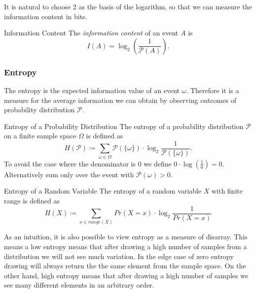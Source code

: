 \documentclass[english]{panikzettel}
\begin{document}
It is natural to choose 2 as the basis of the logarithm, so that we can measure the information content in bits.

\begin{defi}{Information Content}
The \emph{information content} of an event $A$ is
\[
I(A)=\log_2 \left(\frac{1}{\mathcal{P}(A)}\right).
\]
\end{defi}



\subsubsection{Entropy}
The entropy is the expected information value of an event $\omega$. Therefore it is a measure for the average information we can obtain by observing outcomes of probability distribution $\mathcal{P}$.

\begin{halfboxl}
\vspace{-\baselineskip}
\begin{defi}{Entropy of a Probability Distribution}
The entropy of a probability distribution $\mathcal{P}$ on a finite sample space $\Omega$ is defined as
\[
H(\mathcal{P})\coloneqq \sum_{\omega\in\Omega}\mathcal{P}(\{\omega \})\cdot \log_2\frac{1}{\mathcal{P}(\{\omega \})}.
\]
To avoid the case where the denominator is 0 we define $0\cdot \log (\frac{1}{0})=0$. Alternatively sum only over the event with $\mathcal{P}(\omega)>0$.
\end{defi}
\end{halfboxl}
\begin{halfboxr}
\vspace{-\baselineskip}
\begin{defi}{Entropy of a Random Variable}
The entropy of a random variable $X$ with finite range is defined as
{\small{}
\[
H(X)\coloneqq \sum_{x\in range(X)}Pr(X=x)\cdot\log_2 \frac{1}{Pr(X=x)}
\]}
\end{defi}
\end{halfboxr}

As an intuition, it is also possible to view entropy as a measure of disarray. This means a low entropy means that after drawing a high number of samples from a distribution we will not see much variation. In the edge case of zero entropy drawing will always return the the same element from the sample space. On the other hand, high entropy means that after drawing a high number of samples we see many different elements in an arbitrary order.

\end{document}
